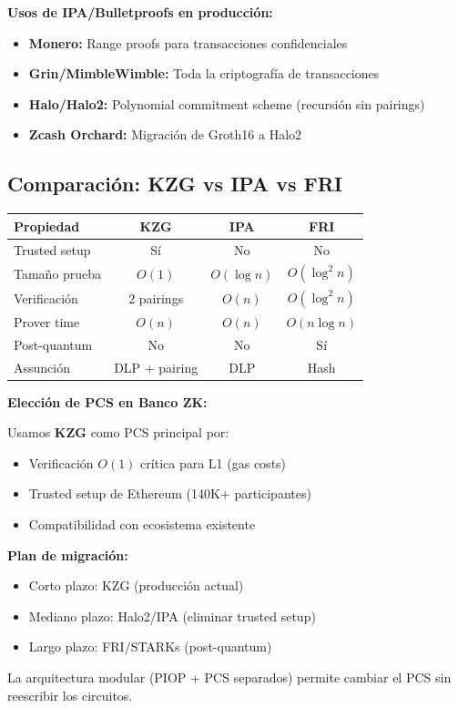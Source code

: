 \documentclass[11pt,a4paper,twoside]{book}
\begin{document}
\begin{remark}
\textbf{Usos de IPA/Bulletproofs en producci\'on:}

\begin{itemize}
    \item \textbf{Monero:} Range proofs para transacciones confidenciales
    \item \textbf{Grin/MimbleWimble:} Toda la criptograf\'ia de transacciones
    \item \textbf{Halo/Halo2:} Polynomial commitment scheme (recursi\'on sin pairings)
    \item \textbf{Zcash Orchard:} Migraci\'on de Groth16 a Halo2
\end{itemize}
\end{remark}

\subsection{Comparaci\'on: KZG vs IPA vs FRI}

\begin{center}
\begin{tabular}{lccc}
\toprule
\textbf{Propiedad} & \textbf{KZG} & \textbf{IPA} & \textbf{FRI} \\
\midrule
Trusted setup & S\'i & No & No \\
Tama\~no prueba & $O(1)$ & $O(\log n)$ & $O(\log^2 n)$ \\
Verificaci\'on & 2 pairings & $O(n)$ & $O(\log^2 n)$ \\
Prover time & $O(n)$ & $O(n)$ & $O(n \log n)$ \\
Post-quantum & No & No & S\'i \\
Assunci\'on & DLP + pairing & DLP & Hash \\
\bottomrule
\end{tabular}
\end{center}

\begin{bancozk}
\textbf{Elecci\'on de PCS en Banco ZK:}

Usamos \textbf{KZG} como PCS principal por:
\begin{itemize}
    \item Verificaci\'on $O(1)$ cr\'itica para L1 (gas costs)
    \item Trusted setup de Ethereum (140K+ participantes)
    \item Compatibilidad con ecosistema existente
\end{itemize}

\textbf{Plan de migraci\'on:}
\begin{itemize}
    \item Corto plazo: KZG (producci\'on actual)
    \item Mediano plazo: Halo2/IPA (eliminar trusted setup)
    \item Largo plazo: FRI/STARKs (post-quantum)
\end{itemize}

La arquitectura modular (PIOP + PCS separados) permite cambiar el PCS sin reescribir los circuitos.
\end{bancozk}
\end{document}
